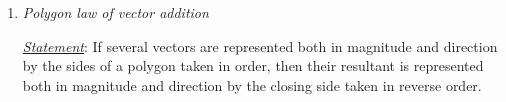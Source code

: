 \begin{enumerate}
%					
%					
%					
			
			\item \textit{Polygon law of vector addition}
			
			\textit{\ul{Statement}}: If several vectors are represented both in magnitude and direction by the sides of a polygon taken in order, then their resultant is represented both in magnitude and direction by the closing side taken in reverse order.
			
%					
%					
		\end{enumerate}
		
